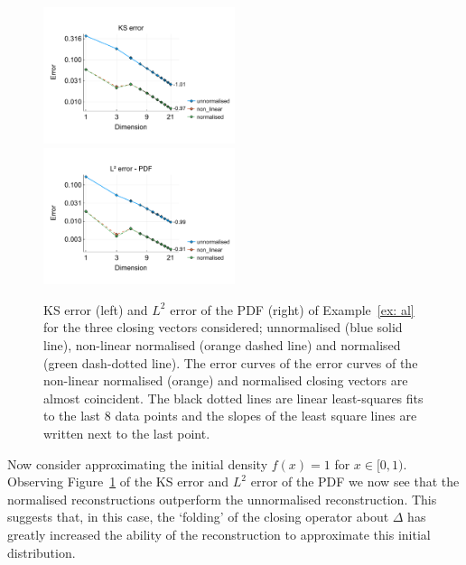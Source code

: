 \begin{example}\label{ex: al}
	\begin{figure}[h]
		\centering
		\includegraphics[width=0.5\textwidth,trim={0.5cm 0.8cm 0.2cm 1.25cm},clip]{chapter6/figs/qbdrap_closing_vec/fun4/ks_error_formatted.pdf}%
		\includegraphics[width=0.5\textwidth,trim={0.5cm 0.8cm 0.2cm 1.25cm},clip]{chapter6/figs/qbdrap_closing_vec/fun4/l2_pdf_error_formatted.pdf}
		\caption{KS error (left) and \(L^2\) error of the PDF (right) of Example~\ref{ex: al} for the three closing vectors considered; unnormalised (blue solid line), non-linear normalised (orange dashed line) and normalised (green dash-dotted line). The error curves of the error curves of the non-linear normalised (orange) and normalised closing vectors are almost coincident. The black dotted lines are linear least-squares fits to the last 8 data points and the slopes of the least square lines are written next to the last point.}
		\label{fig: fun 4 ks error qbdrap closing vecs}
	\end{figure}
	Now consider approximating the initial density \(f(x)=1\) for \(x\in[0,1)\). Observing Figure~\ref{fig: fun 4 ks error qbdrap closing vecs} of the KS error and \(L^2\) error of the PDF we now see that the normalised reconstructions outperform the unnormalised reconstruction. This suggests that, in this case, the `folding' of the closing operator about \(\Delta\) has greatly increased the ability of the reconstruction to approximate this initial distribution. 



\end{example}

